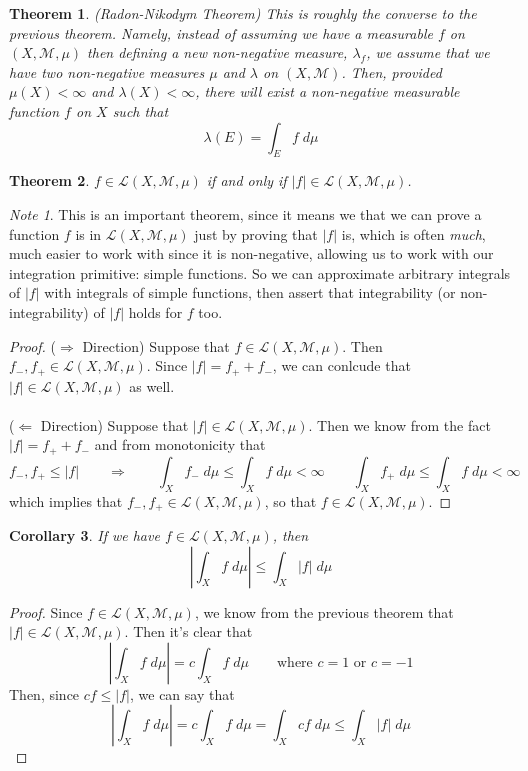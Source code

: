 \documentclass[12pt]{article}
\theoremstyle{plain}
\newtheorem{thm}{Theorem}[subsection]
\newtheorem{cor}[thm]{Corollary}
\theoremstyle{definition}
\theoremstyle{remark}
\newtheorem*{note}{Note}
\begin{document}
\newpage
\begin{thm}
\emph{(Radon-Nikodym Theorem)} This is roughly the converse to the previous theorem. Namely, instead of assuming we have a measurable $f$ on $(X,\mathscr{M},\mu)$ then defining a new non-negative measure, $\lambda_f$, we assume that we have two non-negative measures $\mu$ and $\lambda$ on $(X,\mathscr{M})$. Then, provided $\mu(X)<\infty$ and $\lambda(X)<\infty$, there will exist a non-negative measurable function $f$ on $X$ such that
\[
    \lambda(E) = \int_E f \; d\mu
\]
\end{thm}

\begin{thm}
$f\in\mathscr{L}(X,\mathscr{M},\mu)$ if and only if $|f|\in\mathscr{L}(X,\mathscr{M},\mu)$.
\end{thm}
\begin{note}
This is an important theorem, since it means we that we can prove a function $f$ is in $\mathscr{L}(X,\mathscr{M},\mu)$ just by proving that $|f|$ is, which is often \emph{much}, much easier to work with since it is non-negative, allowing us to work with our integration primitive: simple functions. So we can approximate arbitrary integrals of $|f|$ with integrals of simple functions, then assert that integrability (or non-integrability) of $|f|$ holds for $f$ too.
\end{note}
\begin{proof}
($\Rightarrow$ Direction) Suppose that $f\in\mathscr{L}(X,\mathscr{M},\mu)$. Then $f_-, f_+\in\mathscr{L}(X,\mathscr{M},\mu)$. Since $|f|=f_+ + f_-$, we can conlcude that $|f|\in\mathscr{L}(X,\mathscr{M},\mu)$ as well.
\\
\\
($\Leftarrow$ Direction) Suppose that $|f|\in\mathscr{L}(X,\mathscr{M},\mu)$. Then we know from the fact $|f|=f_+ + f_-$ and from monotonicity that
\[
    f_-, f_+ \leq |f| \qquad \Rightarrow
    \qquad 
    \int_X f_- \; d\mu \leq \int_X f \; d\mu <\infty\qquad
    \int_X f_+ \; d\mu \leq \int_X f \; d\mu <\infty
\]
which implies that $f_-, f_+\in\mathscr{L}(X,\mathscr{M},\mu)$, so that $f\in\mathscr{L}(X,\mathscr{M},\mu)$.
\end{proof}

\begin{cor} If we have $f\in\mathscr{L}(X,\mathscr{M},\mu)$, then 
\[ 
    \left\lvert \int_X f \; d\mu\right\rvert \leq
    \int_X \left\lvert f \right\rvert \; d\mu
\]
\end{cor}
\begin{proof}
Since $f\in\mathscr{L}(X,\mathscr{M},\mu)$, we know from the previous theorem that $|f|\in\mathscr{L}(X,\mathscr{M},\mu)$. Then it's clear that 
\[ 
    \left\lvert \int_X f \; d\mu\right\rvert 
    = c \int_X f \; d\mu\qquad\text{where $c=1$ or $c=-1$}
\]
Then, since $cf\leq |f|$, we can say that 
\[ 
    \left\lvert \int_X f \; d\mu\right\rvert 
    = c \int_X f \; d\mu 
    = \int_X c f \; d\mu \leq 
     \int_X |f| \; d\mu 
\]
\end{proof}
\end{document}
